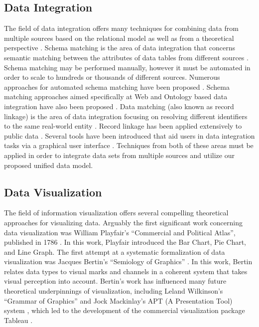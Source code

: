 \subsection{Data Integration}
The field of data integration offers many techniques for combining data from multiple sources based on the relational model \cite{doan2012principles} as well as from a theoretical perspective \cite{lenzerini2002data, halevy2006data, ziegler2004three}. Schema matching is the area of data integration that concerns semantic matching between the attributes of data tables from different sources \cite{rahm2001survey, fagin2003data}. Schema matching may be performed manually, however it must be automated in order to scale to hundreds or thousands of different sources. Numerous approaches for automated schema matching have been proposed \cite{shvaiko2005survey, doan2001reconciling, kang2003schema, milo1998using, madhavan2001generic, doan2000learning}. Schema matching approaches aimed specifically at Web and Ontology based data integration have also been proposed \cite{he2003statistical, noy2004semantic, doan2005semantic, madhavan2007web, kalfoglou2003ontology, noy2009ontology, uschold2004ontologies, wache2001ontology, noy2003prompt, euzenat2007ontology}. Data matching (also known as record linkage) is the area of data integration focusing on resolving different identifiers to the same real-world entity \cite{winkler1999state, winkler2006overview, koudas2006record, aizawa2005fast, gu2003record, winkler1995matching}. Record linkage has been applied extensively to public data \cite{jaro1995probabilistic, jaro1989advances, holman1999population}. Several tools have been introduced that aid users in data integration tasks via a graphical user interface \cite{christen2008febrl, kandel2011wrangler, elfeky2002tailor}. Techniques from both of these areas must be applied in order to integrate data sets from multiple sources and utilize our proposed unified data model.
\subsection{Data Visualization}
The field of information visualization offers several compelling theoretical approaches for visualizing data. Arguably the first significant work concerning data visualization was William Playfair's ``Commercial and Political Atlas'', published in 1786 \cite{playfair1786commercial}. In this work, Playfair introduced the Bar Chart, Pie Chart, and Line Graph. The first attempt at a systematic formalization of data visualization was Jacques Bertin's ``Semiology of Graphics'' \cite{bertin1983semiology}. In this work, Bertin relates data types to visual marks and channels in a coherent system that takes visual perception into account. Bertin's work has influenced many future theoretical underpinnings of visualization, including Leland Wilkinson's ``Grammar of Graphics'' \cite{wilkinson2005grammar} and Jock Mackinlay's APT (A Presentation Tool) system \cite{mackinlay1986automating}, which led to the development of the commercial visualization package Tableau \cite{hanrahan2007visual}.


